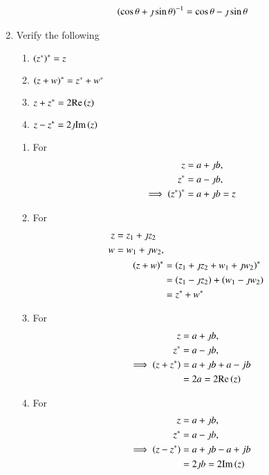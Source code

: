 \begin{enumerate}[label=\arabic*.,ref=\thesubsection.\theenumi]
				\solution  
				\begin{align}
					\left(\cos \theta + \jmath \sin \theta\right)^{-1} = \cos \theta - \jmath \sin \theta
				\end{align}
			\item Verify the following
				\begin{enumerate}
					\item	$\left(z^{*}\right)^{*} = z$
					\item	$\left(z+w\right)^{*} = z^{*}+w^{*}$
					\item $z + z^{*} = 2 \text{Re}\left(z\right)$
					\item $z - z^{*} = 2 \jmath\text{Im}\left(z\right)$
				\end{enumerate}
				\solution
				\begin{enumerate}
					\item For 
				\begin{align}
					z &= a + \jmath b, 	
					\\
					z^{*} &= a - \jmath b, 	
					\\
					\implies \left(z^{*}\right)^{*} &= a +\jmath b = z
				\end{align}
			\item For 
				\begin{align}
					\begin{split}
					z &= z_1 + \jmath z_2
					\\
					w &= w_1 + \jmath w_2,
					\end{split}
					\\
					\left(z+w\right)^{*} &= \left(z_1 + \jmath z_2+ w_1 + \jmath w_2\right)^{*}
					\\
					&= \left(z_1 - \jmath z_2\right)+ \left(w_1 - \jmath w_2\right)
					\\
					&= z^{*} + w^{*}
				\end{align}
			\item 	For 
				\begin{align}
					z &= a + \jmath b, 	
					\\
					z^{*} &= a - \jmath b, 	
					\\
					\implies \left(z+z^{*}\right) &= a +\jmath b + a - jb
					\\
					&=2a = 2 \text{Re}\left(z\right)
				\end{align}
			\item 	For 
				\begin{align}
					z &= a + \jmath b, 	
					\\
					z^{*} &= a - \jmath b, 	
					\\
					\implies \left(z-z^{*}\right) &= a +\jmath b - a + jb
					\\
					&=2\jmath b = 2 \text{Im}\left(z\right)
				\end{align}


\end{enumerate}
\end{enumerate}
